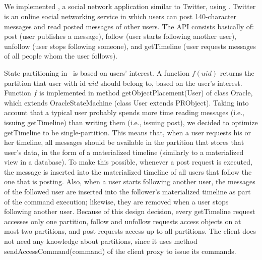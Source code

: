 

\subsection{\appname}

We implemented \appname{}, a social network application similar to Twitter, using \libname{}. Twitter is an online social networking service in which users can post 140-character messages and read posted messages of other users. The API consists basically of: post (user publishes a message), follow (user starts following another user), unfollow (user stops following someone), and getTimeline (user requests messages of all people whom the user follows).

State partitioning in \appname\ is based on users' interest. A function $f(uid)$ returns the partition that user with id $uid$ should belong to, based on the user's interest. Function $f$ is implemented in method getObjectPlacement(User) of class \appname{}Oracle, which extends OracleStateMachine (class User extends PRObject). Taking into account that a typical user probably spends more time reading messages (i.e., issuing getTimeline) than writing them (i.e., issuing post), we decided to optimize getTimeline to be single-partition. This means that, when a user requests his or her timeline, all messages should be available in the partition that stores that user's data, in the form of a materialized timeline (similarly to a materialized view in a database). To make this possible, whenever a post request is executed, the message is inserted into the materialized timeline of all users that follow the one that is posting. Also, when a user starts following another user, the messages of the followed user are inserted into the follower's materialized timeline as part of the command execution; likewise, they are removed when a user stops following another user. Because of this design decision, every getTimeline request accesses only one partition, follow and unfollow requests access objects on at most two partitions, and post requests access up to all partitions. The \appname{} client does not need any knowledge about partitions, since it uses method sendAccessCommand(command) of the \dssmr{} client proxy to issue its commands.

